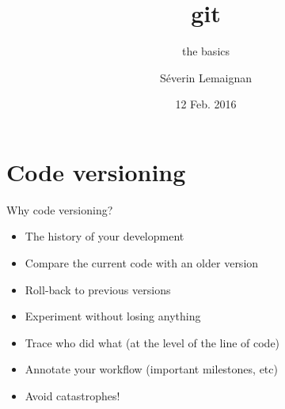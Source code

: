 \documentclass[compress]{beamer}
\title{\Medium git}
\subtitle{the basics}
\date{12 Feb. 2016}
\author{Séverin Lemaignan}
\institute{Centre for Robotics \& Neural
Systems\\{\Medium Plymouth University}}
\begin{document}
\maketitle



{
    \begin{frame}[plain]{}
    \end{frame}
}

\section{Code versioning}

\begin{frame}{Why code versioning?}

    \begin{itemize}
        \item The history of your development
        \item Compare the current code with an older version
        \item Roll-back to previous versions
        \item Experiment without losing anything
        \item Trace who did what (at the level of the line of code)
        \item Annotate your workflow (important milestones, etc)
        \item Avoid catastrophes!
    \end{itemize}
\end{frame}
\end{document}
